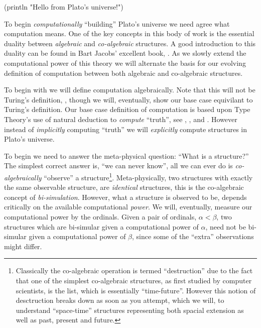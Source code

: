 
\begin{racket}
(println "Hello from Plato's universe!")
\end{racket}

To begin \emph{computationally} ``building'' Plato's universe we need agree what
computation means. One of the key concepts in this body of work is the essential
duality between \emph{algebraic} and \emph{co-algebraic} structures. A good
introduction to this duality can be found in Bart Jacobs' excellent book,
\cite{jacobs2012coalg}. As we slowly extend the computational power of this
theory we will alternate the basis for our evolving definition of computation
between both algebraic and co-algebraic structures.

To begin with we will define computation algebraically. Note that this will not
be Turing's definition, \cite{turing1936computableNumbersMachines}, though we
will, eventually, show our base case equivilant to Turing's definition. Our base
case definition of computation is based upon Type Theory's use of natural
deduction to \emph{compute} ``truth'', see \cite{gentzen1969collectedPapers},
\cite{kleene2009introMetaMathematics}, and
\cite{awodeyCoquandVoevodsky2013homotopyTypeTheory}. However instead of
\emph{implicitly} computing ``truth'' we will \emph{explicitly} compute
structures in Plato's universe.

To begin we need to answer the meta-physical question: ``What is a structure?''
The simplest correct answer is, ``we can never know'', all we can ever do is
\emph{co-algebraically} ``observe'' a structure\footnote{Classically the
co-algebraic operation is termed ``destruction'' due to the fact that one of the
simplest co-algebraic structures, as first studied by computer scientists, is
the list, which is essentially ``time-future''. However this notion of
desctruction breaks down as soon as you attempt, which we will, to understand
``space-time'' structures representing both spacial extension as well as past,
present and future.}. Meta-physically, two structures with exactly the same
observable structure, are \emph{identical} structures, this is the co-algebraic
concept of \emph{bi-simulation}. However, what a structure is observed to be,
depends critically on the available computational \emph{power}. We will,
eventually, measure our computational power by the ordinals. Given a pair of
ordinals, $\alpha < \beta$, two structures which are bi-simular given a
computational power of $\alpha$, need not be bi-simular given a computational
power of $\beta$, since some of the ``extra'' observations might differ.

